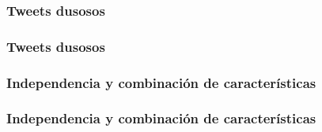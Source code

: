 \subsubsection{Tweets dusosos}
\begin{frame}
    \frametitle{Tweets dusosos}

    
\end{frame}

\subsubsection{Independencia y combinación de características}
\begin{frame}
    \frametitle{Independencia y combinación de características}

    
\end{frame}
